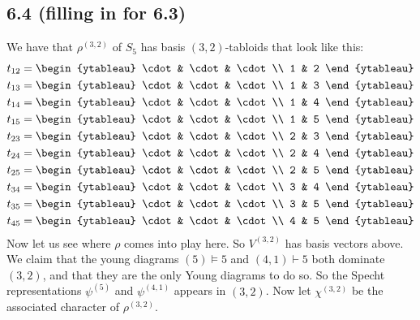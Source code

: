 \documentclass[]{article}
\begin{document}
\subsection*{6.4 (filling in for 6.3)}
We have that $\rho^{(3,2)}$ of $S_5$ has basis $(3,2)$-tabloids that look like this:
\begin{align*}
	t_{12} &= 
	\begin{ytableau}
		\cdot & \cdot & \cdot\\
		1 & 2
	\end{ytableau}\\
		t_{13} &= 
	\begin{ytableau}
		\cdot & \cdot & \cdot\\
		1 & 3
	\end{ytableau}\\
		t_{14} &= 
	\begin{ytableau}
		\cdot & \cdot & \cdot\\
		1 & 4
	\end{ytableau}\\
		t_{15} &= 
	\begin{ytableau}
		\cdot & \cdot & \cdot\\
		1 & 5
	\end{ytableau}\\
		t_{23} &= 
	\begin{ytableau}
		\cdot & \cdot & \cdot\\
		2 & 3
	\end{ytableau}\\
			t_{24} &= 
	\begin{ytableau}
		\cdot & \cdot & \cdot\\
		2 & 4
	\end{ytableau}\\
			t_{25} &= 
	\begin{ytableau}
		\cdot & \cdot & \cdot\\
		2 & 5
	\end{ytableau}\\
			t_{34} &= 
	\begin{ytableau}
		\cdot & \cdot & \cdot\\
		3 & 4
	\end{ytableau}\\
	t_{35} &= 
	\begin{ytableau}
		\cdot & \cdot & \cdot\\
		3 & 5
	\end{ytableau}\\
	t_{45} &= 
	\begin{ytableau}
		\cdot & \cdot & \cdot\\
		4 & 5
	\end{ytableau}\\
\end{align*}
Now let us see where $\rho$ comes into play here. So $V^{(3,2)}$ has basis vectors above. We claim that the young diagrams $(5) \vDash 5$ and $(4,1) \vdash 5$ both dominate $(3,2)$, and that they are the only Young diagrams to do so. So the Specht representations $\psi^{(5)}$ and $\psi^{(4,1)}$ appears in $(3,2)$. Now let $\chi^{(3,2)}$ be the associated character of $\rho^{(3,2)}$. 
\end{document}
